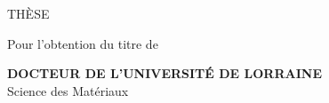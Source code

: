 
\begin{titlepage}

	\begin{figure}
    \begin{center}
      \hfill
      \hfill
    \end{center}
  \end{figure}

  \begin{center}
    \noindent
    \begin{minipage}{0.9\textwidth}\centering
  
    	\begin{center}
    		
    		{\large THÈSE}\\
    		\vspace{5mm}
    
    		{\large Pour l'obtention du titre de}\\
        \vspace{5mm}
        		
    		{\bfseries\large DOCTEUR DE L'UNIVERSITÉ DE LORRAINE}\\
        {Science des Matériaux}
    		\vspace{5mm}
    		

\end{center}
\end{minipage}
\end{center}
\end{titlepage}
